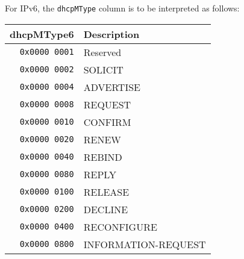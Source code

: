 \documentclass[documentation]{subfiles}
\begin{document}
For IPv6, the {\tt dhcpMType} column is to be interpreted as follows:\\
\begin{minipage}{0.48\textwidth}
    \begin{longtable}{rl}
        \toprule
        {\bf dhcpMType6} & {\bf Description}\\
        \midrule\endhead%
        {\tt 0x0000 0001} & Reserved\\
        {\tt 0x0000 0002} & SOLICIT\\
        {\tt 0x0000 0004} & ADVERTISE\\
        {\tt 0x0000 0008} & REQUEST\\
        {\tt 0x0000 0010} & CONFIRM\\
        {\tt 0x0000 0020} & RENEW\\
        {\tt 0x0000 0040} & REBIND\\
        {\tt 0x0000 0080} & REPLY\\
        {\tt 0x0000 0100} & RELEASE\\
        {\tt 0x0000 0200} & DECLINE\\
        {\tt 0x0000 0400} & RECONFIGURE\\
        {\tt 0x0000 0800} & INFORMATION-REQUEST\\
        \bottomrule
    \end{longtable}
\end{minipage}
\hfill
\end{document}
